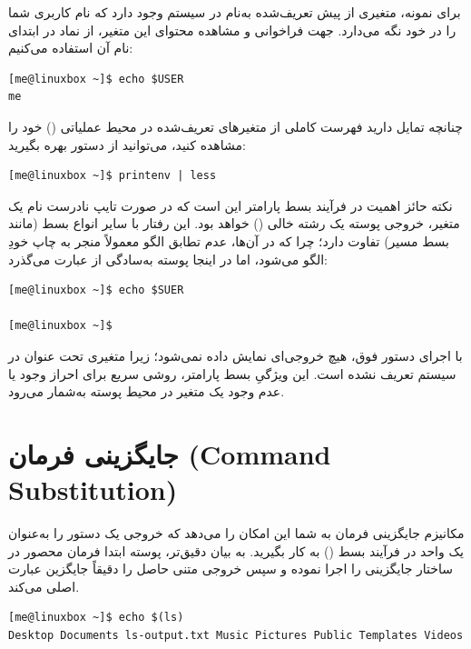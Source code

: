 برای نمونه، متغیری از پیش تعریف‌شده به‌نام  در سیستم وجود دارد که نام کاربری شما را در خود نگه می‌دارد. جهت فراخوانی و مشاهده محتوای این متغیر، از نماد \cmd{\$} در ابتدای نام آن استفاده می‌کنیم:

\begin{latin}
\begin{lstlisting}
[me@linuxbox ~]$ echo $USER
me
\end{lstlisting}
\end{latin}

چنانچه تمایل دارید فهرست کاملی از متغیرهای تعریف‌شده در محیط عملیاتی () خود را مشاهده کنید، می‌توانید از دستور  بهره بگیرید:

\begin{latin}
\begin{lstlisting}
[me@linuxbox ~]$ printenv | less
\end{lstlisting}
\end{latin}

نکته حائز اهمیت در فرآیند بسط پارامتر این است که در صورت تایپ نادرست نام یک متغیر، خروجی پوسته یک رشته خالی () خواهد بود. این رفتار با سایر انواع بسط (مانند بسط مسیر) تفاوت دارد؛ چرا که در آن‌ها، عدم تطابق الگو معمولاً منجر به چاپ خودِ الگو می‌شود، اما در اینجا پوسته به‌سادگی از عبارت می‌گذرد:

\begin{latin}
\begin{lstlisting}
[me@linuxbox ~]$ echo $SUER

[me@linuxbox ~]$
\end{lstlisting}
\end{latin}

با اجرای دستور فوق، هیچ خروجی‌ای نمایش داده نمی‌شود؛ زیرا متغیری تحت عنوان  در سیستم تعریف نشده است. این ویژگیِ بسط پارامتر، روشی سریع برای احراز وجود یا عدم وجود یک متغیر در محیط پوسته به‌شمار می‌رود.

\section{جایگزینی فرمان (Command Substitution)}

مکانیزم جایگزینی فرمان به شما این امکان را می‌دهد که خروجی یک دستور را به‌عنوان یک واحد در فرآیند بسط () به کار بگیرید. به بیان دقیق‌تر، پوسته ابتدا فرمان محصور در ساختار جایگزینی را اجرا نموده و سپس خروجی متنی حاصل را دقیقاً جایگزین عبارت اصلی می‌کند.

\begin{latin}
\begin{lstlisting}
[me@linuxbox ~]$ echo $(ls)
Desktop Documents ls-output.txt Music Pictures Public Templates Videos
\end{lstlisting}
\end{latin}

